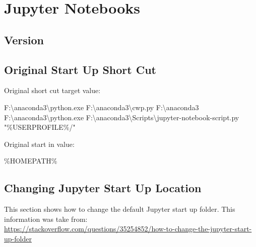 	\section{Jupyter Notebooks}
	\subsection{Version}

	\subsection{Original Start Up Short Cut}
Original short cut target value:
	\begin{code}[\codenumbering]{}
		\codeitemnonumber F:\textbackslash{}anaconda3\textbackslash{}python.exe F:\textbackslash{}anaconda3\textbackslash{}cwp.py F:\textbackslash{}anaconda3 F:\textbackslash{}anaconda3\textbackslash{}python.exe F:\textbackslash{}anaconda3\textbackslash{}Scripts\textbackslash{}jupyter-notebook-script.py "\%USERPROFILE\%/"
	\end{code}

\noindent Original start in value:
	\begin{code}[\codenumbering]{}
		\codeitemnonumber \%HOMEPATH\%
	\end{code}


	\subsection{Changing Jupyter Start Up Location}
This section shows how to change the default Jupyter start up folder.  This information was take from:\\
{\small \url{https://stackoverflow.com/questions/35254852/how-to-change-the-jupyter-start-up-folder}}

